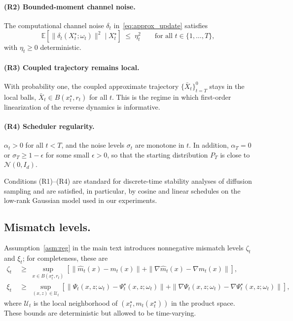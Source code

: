 \documentclass{article}
\theoremstyle{plain}
\theoremstyle{definition}
\theoremstyle{remark}
\begin{document}
\paragraph{(R2) Bounded-moment channel noise.}
The computational channel noise \(\delta_t\) in~\eqref{eq:approx_update}
satisfies
\begin{equation}
\mathbb{E}\!\left[\|\delta_t(X_t^\star;\omega_t)\|^2 \mid X_t^\star\right]
\;\le\; \eta_t^2
\qquad\text{for all }t\in\{1,\dots,T\},
\label{eq:app_bounded_noise}
\end{equation}
with \(\eta_t\ge 0\) deterministic.

\paragraph{(R3) Coupled trajectory remains local.}
With probability one, the coupled approximate trajectory
\(\{\bar X_t\}_{t=T}^{0}\) stays in the local balls,
\(\bar X_t \in B(x_t^\star, r_t)\) for all \(t\). This is the regime in
which first-order linearization of the reverse dynamics is informative.

\paragraph{(R4) Scheduler regularity.}
\(\alpha_t>0\) for all \(t<T\), and the noise levels \(\sigma_t\) are
monotone in \(t\). In addition, \(\alpha_T=0\) or \(\sigma_T\ge 1-\epsilon\)
for some small \(\epsilon>0\), so that the starting distribution
\(P_T\) is close to \(\mathcal{N}(0,I_d)\).

Conditions (R1)--(R4) are standard for discrete-time stability analyses of
diffusion sampling \citep{reeves2025itproofs,zhong2026iec} and are
satisfied, in particular, by cosine and linear schedules on the
low-rank Gaussian model used in our experiments.

\subsection{Mismatch levels.}
Assumption~\ref{asm:reg} in the main text introduces nonnegative mismatch
levels \(\zeta_t\) and \(\xi_t\); for completeness, these are
\begin{align*}
\zeta_t &\;\ge\;
  \sup_{x\in B(x_t^\star,r_t)}
  \left[\|\hat m_t(x) - m_t(x)\| + \|\nabla \hat m_t(x) - \nabla m_t(x)\|\right],\\
\xi_t &\;\ge\;
  \sup_{(x,z)\in \mathcal{U}_t}
  \left[\|\Psi_t(x,z;\omega_t) - \Psi_t^\star(x,z;\omega_t)\|
   + \|\nabla \Psi_t(x,z;\omega_t) - \nabla \Psi_t^\star(x,z;\omega_t)\|\right],
\end{align*}
where \(\mathcal{U}_t\) is the local neighborhood of
\((x_t^\star, m_t(x_t^\star))\) in the product space. These bounds are
deterministic but allowed to be time-varying.
\end{document}
